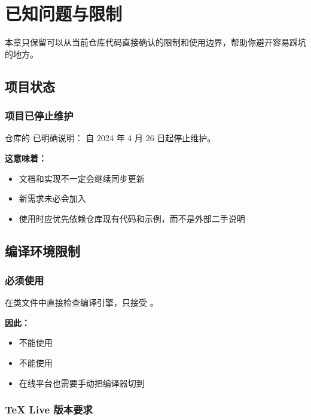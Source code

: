 
\section{已知问题与限制}

本章只保留可以从当前仓库代码直接确认的限制和使用边界，帮助你避开容易踩坑的地方。

\subsection{项目状态}

\subsubsection{项目已停止维护}

仓库的  已明确说明： 自 2024 年 4 月 26 日起停止维护。

\textbf{这意味着：}
\begin{itemize}
  \item 文档和实现不一定会继续同步更新
  \item 新需求未必会加入
  \item 使用时应优先依赖仓库现有代码和示例，而不是外部二手说明
\end{itemize}


\subsection{编译环境限制}

\subsubsection{必须使用 \XeLaTeX{}}

 在类文件中直接检查编译引擎，只接受 \XeLaTeX{}。

\textbf{因此：}
\begin{itemize}
  \item 不能使用 \pdfLaTeX{}
  \item 不能使用 \LuaLaTeX{}
  \item 在线平台也需要手动把编译器切到 \XeLaTeX{}
\end{itemize}

\subsubsection{\TeX{} Live 版本要求}

